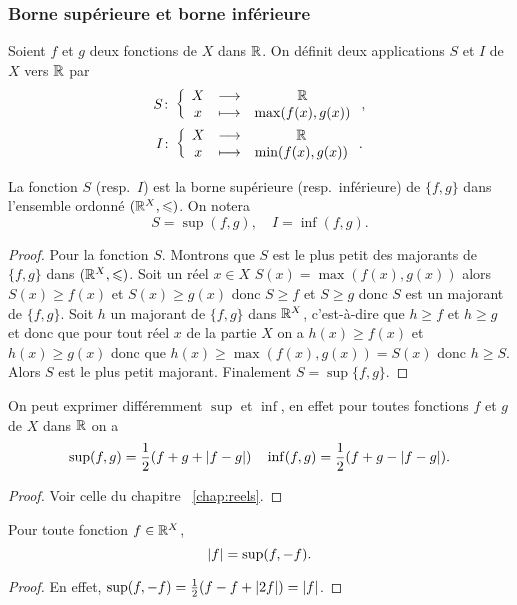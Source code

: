 \subsubsection{Borne supérieure et borne inférieure}
\begin{defdef}
  Soient \(f\) et \(g\) deux fonctions de \(X\) dans \(\mathbb{R}\). On définit deux applications \(S\) et \(I\) de \(X\) vers \(\mathbb{R}\) par
  \begin{gather}
    S\colon \left\{\begin{array}{ccc} X & \longrightarrow &\mathbb{R}\\ x & \longmapsto & \max(f(x),g(x)) \end{array} \right.,\\
    I\colon \left\{\begin{array}{ccc} X & \longrightarrow &\mathbb{R}\\ x & \longmapsto & \min(f(x),g(x)) \end{array} \right..
  \end{gather}
\end{defdef}

\begin{prop}
  La fonction \(S\) (resp.\ \(I\)) est la borne supérieure (resp.\ inférieure) de \(\{f,g\}\) dans l'ensemble ordonné \((\mathbb{R}^X, \leqslant)\). On notera
  \begin{equation}
    S=\sup(f,g), \quad I=\inf(f,g).
  \end{equation}
\end{prop}
\begin{proof}
Pour la fonction \(S\). Montrons que \(S\) est le plus petit des majorants de \(\{f,g\}\) dans \((\mathbb{R}^X, \leqslant)\). Soit un réel \(x \in X\) \(S(x)=\max(f(x),g(x))\) alors \(S(x) \geqslant f(x)\) et \(S(x) \geqslant g(x)\) donc \(S \geqslant f\) et \(S \geqslant g\) donc \(S\) est un majorant de \(\{f,g\}\). Soit \(h\) un majorant de \(\{f,g\}\) dans \(\mathbb{R}^X\), c'est-à-dire que \(h \geqslant f\) et \(h \geqslant g\) et donc que pour tout réel \(x\) de la partie \(X\) on a \(h(x) \geqslant f(x)\) et \(h(x) \geqslant g(x)\) donc que \(h(x) \geqslant \max(f(x),g(x))=S(x)\) donc \(h \geqslant S\). Alors \(S\) est le plus petit majorant. Finalement \(S=\sup\{f,g\}\).
\end{proof}
\begin{prop}
  On peut exprimer différemment \(\sup\) et \(\inf\), en effet pour toutes fonctions \(f\) et \(g\) de \(X\) dans \(\mathbb{R}\) on a
  \begin{equation}
    \sup(f,g)=\frac{1}{2}(f+g+\left\lvert f-g\right\rvert) \quad \inf(f,g)=\frac{1}{2}(f+g-\left\lvert f-g\right\rvert).
  \end{equation}
\end{prop}
\begin{proof}
  Voir celle du chapitre~
\ref{chap:reels}.
\end{proof}
\begin{cor}
  Pour toute fonction \(f \in \mathbb{R}^X\),
  \begin{equation}
    \left\lvert f\right\rvert=\sup(f,-f).
  \end{equation}
\end{cor}
\begin{proof}
  En effet, \(\sup(f,-f)=\frac{1}{2}(f-f+\left\lvert2f\right\rvert)=\left\lvert f\right\rvert\).
\end{proof}

